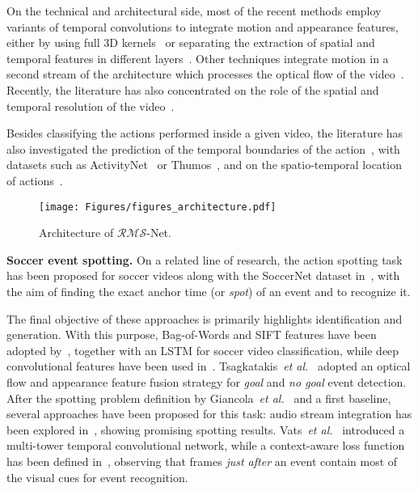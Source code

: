 \documentclass[a4paper,conference]{IEEEtran}
\def \OURS {$\mathcal{RMS}$-Net}
\newcommand{\tit}[1]{\smallbreak\noindent\textbf{#1.}}
\def \etal {\emph{et al.}}
\begin{document}
On the technical and architectural side, most of the recent methods employ variants of temporal convolutions to integrate motion and appearance features, either by using full 3D kernels~\cite{tran2015learning, carreira2017quo} or separating the extraction of spatial and temporal features in different layers~\cite{feichtenhofer2016spatiotemporal, varol2017long}. Other techniques integrate motion in a second stream of the architecture which processes the optical flow of the video~\cite{feichtenhofer2016convolutional,simonyan2014two}. Recently, the literature has also concentrated on the role of the spatial and temporal resolution of the video~\cite{feichtenhofer2019slowfast, Wu_2020_CVPR}.


Besides classifying the actions performed inside a given video, the literature has also investigated the prediction of the temporal boundaries of the action~\cite{zeng2019graph, lin2019bmn, lin2018bsn}, with datasets such as ActivityNet~\cite{caba2015activitynet} or Thumos~\cite{idrees2017thumos}, and on the spatio-temporal location of actions~\cite{gu2018ava}. 


\begin{figure}[t]
\centering
\texttt{[image: Figures/figures\_architecture.pdf]}
\caption{Architecture of \OURS.}
\label{fig:model}
\end{figure}

\tit{Soccer event spotting}
On a related line of research, the action spotting task has been proposed for soccer videos along with the SoccerNet dataset in~\cite{giancola2018soccernet}, with the aim of finding the exact anchor time (or \textit{spot}) of an event and to recognize it.

The final objective of these approaches is primarily highlights identification and generation. With this purpose, Bag-of-Words and SIFT features have been adopted by~\cite{baccouche2010action}, together with an LSTM for soccer video classification, while deep convolutional features have been used in~\cite{jiang2016automatic}. Tsagkatakis~\etal~\cite{tsagkatakis2017goal} adopted an optical flow and appearance feature fusion strategy for \textit{goal} and \textit{no goal} event detection. After the spotting problem definition by Giancola~\etal~\cite{giancola2018soccernet} and a first baseline, several approaches have been proposed for this task: audio stream integration has been explored in~\cite{vanderplaetse2020improved}, showing promising spotting results. Vats~\etal~\cite{vats2020event} introduced a multi-tower temporal convolutional network, while a context-aware loss function has been defined in~\cite{cioppa2020context}, observing that frames \textit{just after} an event contain most of the visual cues for event recognition.
\end{document}

